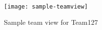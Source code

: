 \documentclass[../manifest.tex]{subfiles}
\begin{document}
\begin{figure}[h]
  \centering
  \texttt{[image: sample-teamview]}
  \caption{Sample team view for Team127}
  \label{fig:sample-teamview}
\end{figure}






\end{document}
